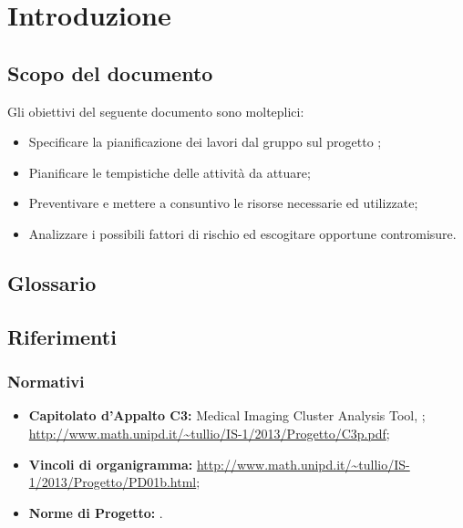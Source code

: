 
\section{Introduzione}
\label{Introduzione}

	\subsection{Scopo del documento}
	\label{ScopoDelDocumento}
		Gli obiettivi del seguente documento sono molteplici:
		\begin{itemize}
			\item Specificare la pianificazione dei lavori dal gruppo \authorName{} sul progetto \project{};
			\item Pianificare le tempistiche delle attività da attuare;
			\item Preventivare e mettere a consuntivo le risorse necessarie ed utilizzate;
			\item Analizzare i possibili fattori di rischio ed escogitare opportune contromisure.
		\end{itemize}
	\subsection{Glossario}
		\label{Glossario}
		\glossIntro{}
	\subsection{Riferimenti}
	\label{Riferimenti}
		\subsubsection{Normativi}
		\label{RifNormativi}
			\begin{itemize}
				\item \textbf{Capitolato d'Appalto C3:} \project{} Medical Imaging Cluster Analysis Tool, \proposerName;\\				
				\url{http://www.math.unipd.it/~tullio/IS-1/2013/Progetto/C3p.pdf};
				
				\item \textbf{Vincoli di organigramma:}	\url{http://www.math.unipd.it/~tullio/IS-1/2013/Progetto/PD01b.html};
				
				\item \textbf{Norme di Progetto:} \NdP.		
			\end{itemize}
			
